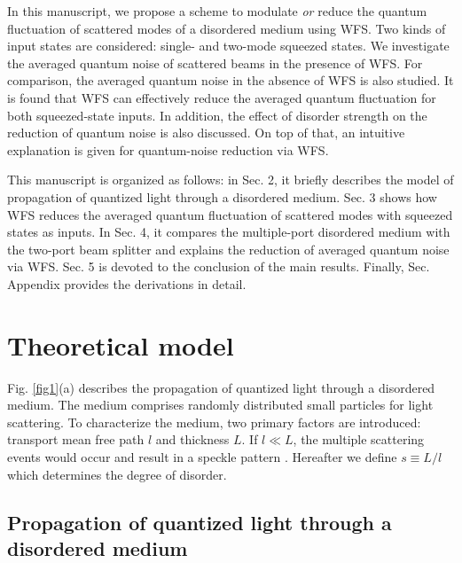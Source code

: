 \documentclass[9pt,twocolumn,twoside]{osajnl}
\begin{document}
In this manuscript, we propose a scheme to modulate \textit{or} reduce the quantum fluctuation of scattered modes of a disordered medium using WFS. Two kinds of input states are considered: single- and two-mode squeezed states. We investigate the averaged quantum noise of scattered beams in the presence of WFS. For comparison, the averaged quantum noise in the absence of WFS is also studied. It is found that WFS can effectively reduce the averaged quantum fluctuation for both squeezed-state inputs. In addition, the effect of disorder strength on the reduction of quantum noise is also discussed. On top of that, an intuitive explanation is given for quantum-noise reduction via WFS.

This manuscript is organized as follows: in Sec. 2, it briefly describes the model of propagation of quantized light through a disordered medium. Sec. 3 shows how WFS reduces the averaged quantum fluctuation of scattered modes with squeezed states as inputs. In Sec. 4, it compares the multiple-port disordered medium with the two-port beam splitter and explains the reduction of averaged quantum noise via WFS. Sec. 5 is devoted to the conclusion of the main results. Finally, Sec. Appendix provides the derivations in detail.



\section{Theoretical model}


Fig. \ref{fig1}(a) describes the propagation of quantized light through a disordered medium. The medium comprises randomly distributed small particles for light scattering. To characterize the medium, two primary factors are introduced: transport mean free path $l$ and thickness $L$. If $l \ll L$, the multiple scattering events would occur and result in a speckle pattern \cite{beenakker1997}. Hereafter we define $s \equiv L/l$ which determines the degree of disorder. 

\subsection{Propagation of quantized light through a disordered medium}
\end{document}
